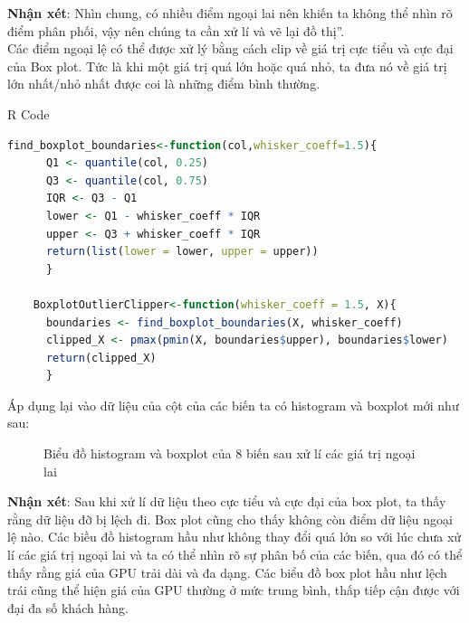 \documentclass[a4paper]{article}
\newcommand{\gachdau}{\hspace*{1.5em}\ignorespaces}
\begin{document}
\newpage
            \hspace{1pt}
            \fontsize{13pt}{15pt}\selectfont \textbf{Nhận xét}: Nhìn chung, có nhiều điểm ngoại lai nên khiến ta không thể nhìn rõ điểm phân phối, vậy nên chúng ta cần xử lí và vẽ lại đồ thị”.\\
            \gachdau
            \fontsize{13pt}{15pt}\selectfont  Các điểm ngoại lệ có thể được xử lý bằng cách clip về giá trị cực tiểu và cực đại của Box plot. Tức là khi một giá trị quá lớn hoặc quá nhỏ, ta đưa nó về giá trị lớn nhất/nhỏ nhất được coi là những điểm bình thường.
\begin{mybox}{R Code}
\begin{lstlisting}[language={R}] 
    find_boxplot_boundaries<-function(col,whisker_coeff=1.5){
      Q1 <- quantile(col, 0.25)
      Q3 <- quantile(col, 0.75)
      IQR <- Q3 - Q1
      lower <- Q1 - whisker_coeff * IQR
      upper <- Q3 + whisker_coeff * IQR
      return(list(lower = lower, upper = upper))
      }
      
    BoxplotOutlierClipper<-function(whisker_coeff = 1.5, X){
      boundaries <- find_boxplot_boundaries(X, whisker_coeff)
      clipped_X <- pmax(pmin(X, boundaries$upper), boundaries$lower)
      return(clipped_X)
      }
\end{lstlisting}
\end{mybox}
            \hspace{1pt}
            \fontsize{13pt}{15pt}\selectfont Áp dụng lại vào dữ liệu của cột của các biến ta có histogram và boxplot mới như sau:
            \vspace{-10pt}
            \begin{figure}[H]
                \centering
                
                
                
                
                
                
                
                
                \caption{Biểu đồ histogram và boxplot của 8 biến sau xử lí các giá trị ngoại lai}
            \end{figure}
            \vspace{-15pt}
            \hspace{1pt}
            \fontsize{13pt}{15pt}\selectfont \textbf{Nhận xét}: Sau khi xử lí dữ liệu theo cực tiểu và cực đại của box plot, ta thấy rằng dữ liệu đỡ bị lệch đi. Box plot cũng cho thấy không còn điểm dữ liệu ngoại lệ nào. Các biều đồ histogram hầu như không thay đổi quá lớn so với lúc chưa xử lí các giá trị ngoại lai và ta có thể nhìn rõ sự phân bố của các biến, qua đó có thể thấy rằng giá của GPU trải dài và đa dạng. Các biểu đồ box plot hầu như lệch trái cũng thể hiện giá của GPU thường ở mức trung bình, thấp tiếp cận được với đại đa số khách hàng.
\end{document}
